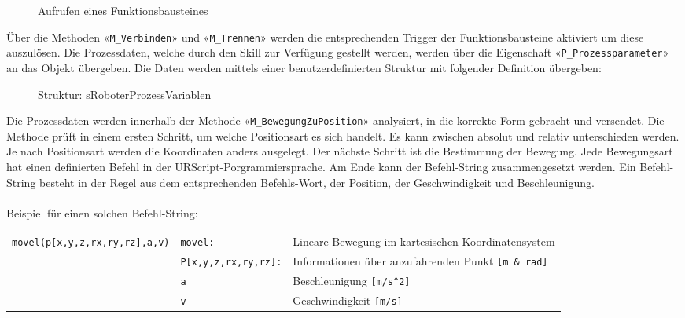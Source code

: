 		\begin{figure}[h!]
			\centering
			\captionsetup{justification=centering}
			\caption{Aufrufen eines Funktionsbausteines}
			\label{fig:FB_Roboter_SendStart}
		\end{figure}
		
		Über die Methoden «\verb|M_Verbinden|» und «\verb|M_Trennen|» werden die entsprechenden Trigger der Funktionsbausteine aktiviert um diese auszulösen.  
		Die Prozessdaten, welche durch den Skill zur Verfügung gestellt werden, werden über die Eigenschaft «\verb|P_Prozessparameter|» an das Objekt übergeben. Die Daten werden mittels einer benutzerdefinierten Struktur mit folgender Definition übergeben:
		
		\begin{figure}[h!]
			\centering
			\captionsetup{justification=centering}
			\caption{Struktur: sRoboterProzessVariablen}
			\label{fig:sRoboterProzessVariablen}
		\end{figure}
		
		Die Prozessdaten werden innerhalb der Methode «\verb|M_BewegungZuPosition|» analysiert, in die korrekte Form gebracht und versendet.  Die Methode prüft in einem ersten Schritt, um welche Positionsart es sich handelt. Es kann zwischen absolut und relativ unterschieden werden. Je nach Positionsart werden die Koordinaten anders ausgelegt. Der nächste Schritt ist die Bestimmung der Bewegung. Jede Bewegungsart hat einen definierten Befehl in der URScript-Porgrammiersprache. Am Ende kann der Befehl-String zusammengesetzt werden. Ein Befehl-String besteht in der Regel aus dem entsprechenden Befehls-Wort, der Position, der Geschwindigkeit und Beschleunigung. 
		\\
		\\
		Beispiel für einen solchen Befehl-String: 
		
		\begin{tabularx}{\textwidth}{@{}>{}p{12em} @{}>{}p{10em} X@{}}
			\scriptsize 
			\verb|movel(p[x,y,z,rx,ry,rz],a,v)| 	& \verb|movel:|	& Lineare Bewegung im kartesischen Koordinatensystem 
			\\
										& \verb|P[x,y,z,rx,ry,rz]:| & Informationen über anzufahrenden Punkt \verb|[m & rad]|
			\\
													& \verb|a|		& Beschleunigung \verb|[m/s^2]|
			\\
													& \verb|v|		& Geschwindigkeit \verb|[m/s]|
			\\
		\end{tabularx}
		
